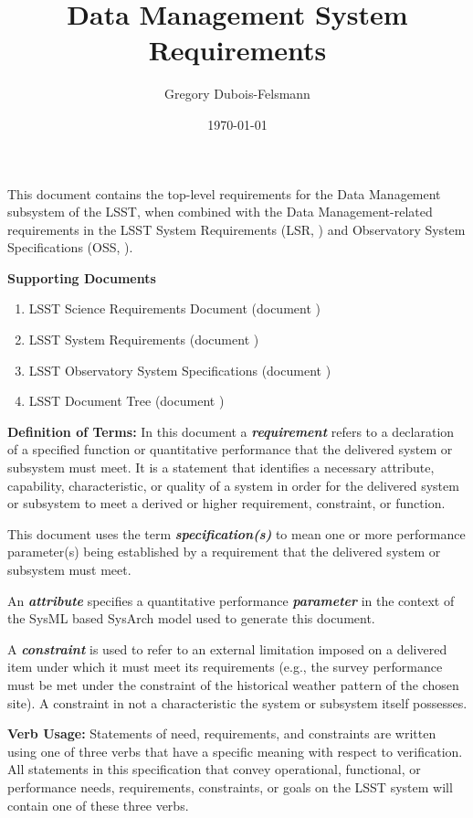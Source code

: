 \documentclass[SE,toc,lsstdraft]{lsstdoc}
\title{Data Management System Requirements}
\author{Gregory Dubois-Felsmann}
\date{\today}
\begin{document}
\maketitle

This document contains the top-level requirements for the Data Management subsystem of the LSST, when combined with the Data Management-related requirements in the LSST System Requirements (LSR, ) and Observatory System Specifications (OSS, ).

\textbf{Supporting Documents}

\begin{enumerate}
 \item{LSST Science Requirements Document (document )    }
 \item{LSST System Requirements (document )    }
 \item{LSST Observatory System Specifications (document )    }
 \item{LSST Document Tree (document )    }
\end{enumerate}

\textbf{Definition of Terms:}
In this document a \textbf{\textit{requirement}} refers to a declaration of a specified function or quantitative performance that the delivered system or subsystem must meet.  It is a statement that identifies a necessary attribute, capability, characteristic, or quality of a system in order for the delivered system or subsystem to meet a derived or higher requirement, constraint, or function.

This document uses the term \textbf{\textit{specification(s)}} to mean one or more performance parameter(s) being established by a requirement that the delivered system or subsystem must meet.

An \textbf{\textit{attribute}} specifies a quantitative performance \textbf{\textit{parameter}} in the context of the SysML based SysArch model used to generate this document.

A \textbf{\textit{constraint}} is used to refer to an external limitation imposed on a delivered item under which it must meet its requirements (e.g., the survey performance must be met under the constraint of the historical weather pattern of the chosen site).  A constraint in not a characteristic the system or subsystem itself possesses.

\textbf{Verb Usage:}
Statements of need, requirements, and constraints are written using one of three verbs that have a specific meaning with respect to verification.  All statements in this specification that convey operational, functional, or performance needs, requirements, constraints, or goals on the LSST system will contain one of these three verbs.
\end{document}
